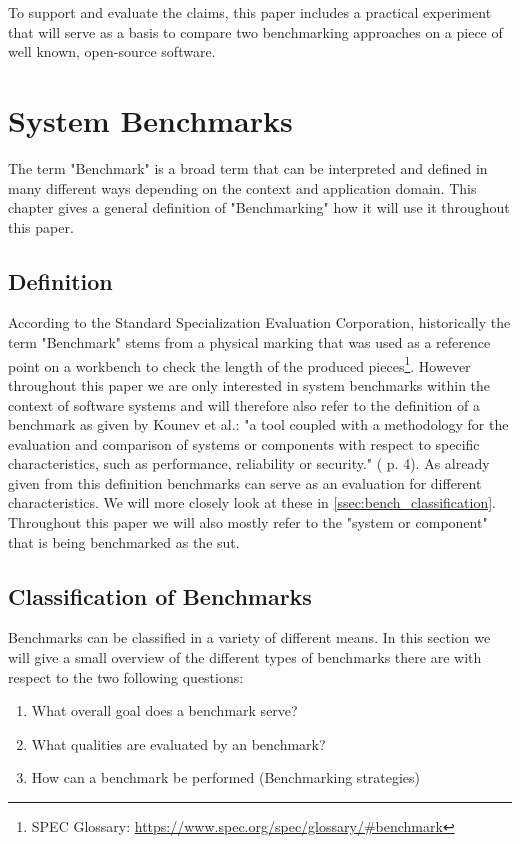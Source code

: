 \documentclass[	runningheads,
				a4paper]{llncs}
\begin{document}
To support and evaluate the claims, this paper includes a practical experiment that will serve as a basis to compare two benchmarking approaches on a piece of well known, open-source software.

\section{System Benchmarks}
\label{sec:benchmarking}
The term "Benchmark" is a broad term that can be interpreted and defined in many different ways depending on the context and application domain. This chapter gives a general definition of "Benchmarking" how it will use it throughout this paper.

\subsection{Definition}
\label{ssec:bench_definition}
According to the Standard Specialization Evaluation Corporation, historically the term "Benchmark" stems from a physical marking that was used as a reference point on a workbench to check the length of the produced pieces\footnote{SPEC Glossary: \url{https://www.spec.org/spec/glossary/\#benchmark}}. However throughout this paper we are only interested in system benchmarks within the context of software systems and will therefore also refer to the definition of a benchmark as given by Kounev et al.: "a tool coupled with a methodology for the evaluation and comparison of systems or components with respect to specific characteristics, such as performance, reliability or security." (\cite{Kounev} p. 4). As already given from this definition benchmarks can serve as an evaluation for different characteristics. We will more closely look at these in \autoref{ssec:bench_classification}. Throughout this paper we will also mostly refer to the "system or component" that is being benchmarked as the \gls{sut}.

\subsection{Classification of Benchmarks}
\label{ssec:bench_classification}
Benchmarks can be classified in a variety of different means. In this section we will give a small overview of the different types of benchmarks there are with respect to the two following questions:
\begin{enumerate}
	\item What overall goal does a benchmark serve?
	\item What qualities are evaluated by an benchmark?
	\item How can a benchmark be performed (Benchmarking strategies)
\end{enumerate}
\end{document}
